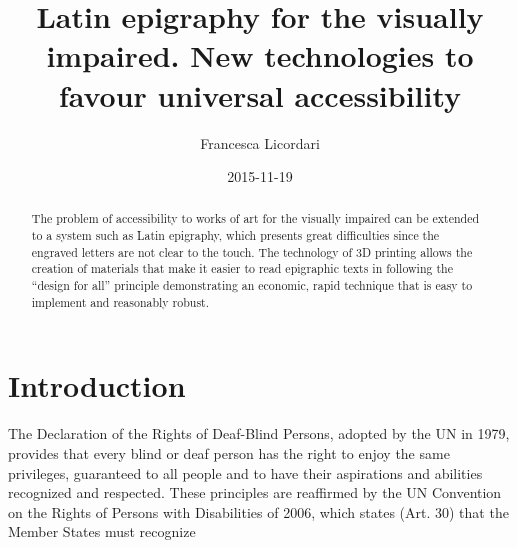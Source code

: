 \documentclass[amsthm,ebook]{saparticle}
\title{Latin epigraphy for the visually impaired. New technologies to favour universal accessibility}
\author[mne]{Francesca Licordari\corref{first}}
\date{2015-11-19}
\begin{document}
\maketitle
\begin{abstract}
The problem of accessibility to works of art for the visually impaired can be extended to a system such as Latin
epigraphy, which presents great difficulties since the engraved letters are not clear to the touch. The technology of
3D printing allows the creation of materials that make it easier to read epigraphic texts in following the ``design for
all'' principle demonstrating an economic, rapid technique that is easy to implement and reasonably robust.
\end{abstract}




\section{Introduction}
\noindent The Declaration of the Rights of Deaf-Blind Persons, adopted by the UN in 1979, provides that every blind or deaf person
has the right to enjoy the same privileges, guaranteed to all people and to have their aspirations and abilities
recognized and respected. These principles are reaffirmed by the UN Convention on the Rights of Persons with
Disabilities of 2006, which states (Art. 30) that the Member States must recognize 
\end{document}

